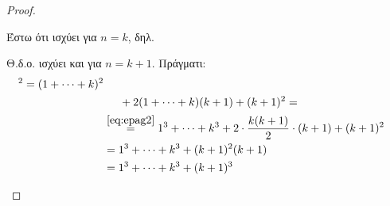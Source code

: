 \begin{multicols}{2}
\begin{enumerate}
\begin{proof}
\begin{enumerate}
            Έστω ότι ισχύει για $ n=k $, δηλ. 

            Θ.δ.ο. ισχύει και για $ n=k+1 $. Πράγματι:
            \begin{align*}
              [1+ \cdots &+ k + (k+1)]^{2} 
              = (1+\cdots + k)^{2} \\
                         & \hspace{0.5cm} + 2(1+\cdots + k)(k+1) + (k+1)^{2} = \\
                         &\overset{\eqref{eq:epag2}}{=} 1^{3}+\cdots +k^{3} + 2\cdot 
                         \frac{k(k+1)}{2}\cdot (k+1) + (k+1)^{2} \\
                         &=1^{3}+\cdots +k^{3}+(k+1)^{2}(k+1) \\
                         &= 1^{3}+\cdots +k^{3}+(k+1)^{3}
            \end{align*} 
        \end{enumerate}
      \end{proof}


\end{enumerate}
\end{multicols}
